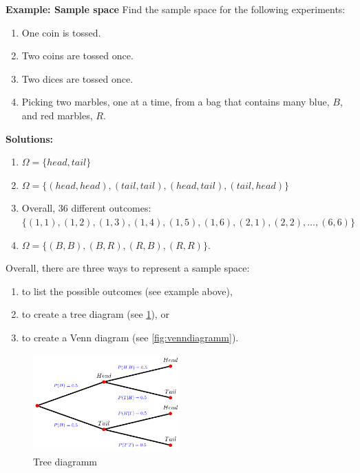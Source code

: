 \documentclass[
  12pt,
  oneside]{book}
\providecommand{\tightlist}{%
  \setlength{\itemsep}{0pt}\setlength{\parskip}{0pt}}
\theoremstyle{definition}
\theoremstyle{definition}
\theoremstyle{definition}
\theoremstyle{definition}
\theoremstyle{remark}
\begin{document}
\textbf{Example: Sample space}
Find the sample space for the following experiments:

\begin{enumerate}
\def\labelenumi{\alph{enumi})}
\tightlist
\item
  One coin is tossed.
\item
  Two coins are tossed once.
\item
  Two dices are tossed once.
\item
  Picking two marbles, one at a time, from a bag that contains many blue, \(B\), and red marbles, \(R\).
\end{enumerate}

\textbf{Solutions:}

\begin{enumerate}
\def\labelenumi{\alph{enumi})}
\tightlist
\item
  \(\Omega = \{head, tail\}\)
\item
  \(\Omega = \{(head, head), (tail, tail),(head, tail),(tail, head)\}\)
\item
  Overall, 36 different outcomes:
  \(\{
       (1,1),(1,2),(1,3),(1,4),(1,5),(1,6),(2,1),(2,2),\dots,(6,6)
       \}\)
\item
  \(\Omega = \{(B,B), (B,R), (R,B), (R,R)\}\).
\end{enumerate}

Overall, there are three ways to represent a sample space:

\begin{enumerate}
\def\labelenumi{\arabic{enumi}.}
\tightlist
\item
  to list the possible outcomes (see example above),
\item
  to create a tree diagram (see \ref{fig:decisiontree}), or
\item
  to create a Venn diagram (see \ref{fig:venndiagramm}).
\end{enumerate}

\begin{figure}
\centering
\includegraphics[width=0.5\textwidth,height=\textheight]{fig/treedia.png}
\caption{\label{fig:decisiontree} Tree diagramm}
\end{figure}
\end{document}
